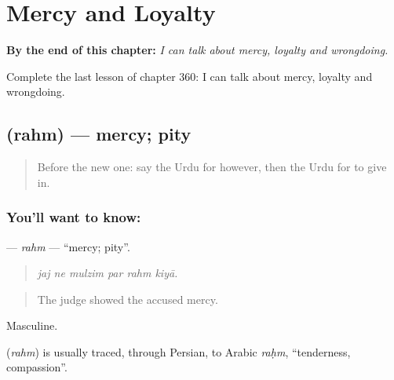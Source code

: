 
\chapter{Mercy and Loyalty}
\label{ch:ur-mercy-and-loyalty}

\begin{chapteropening}
\textbf{By the end of this chapter:} \emph{I can talk about mercy, loyalty and wrongdoing.}

Complete the last lesson of chapter 360: I can talk about mercy, loyalty and wrongdoing.
\end{chapteropening}

\section[\texorpdfstring{\ur{رحم} (rahm)}{رحم (rahm)}]{ (rahm) — mercy; pity}

\label{lesson:UR-C360-rahm}



\begin{quote}
Before the new one: say the Urdu for however, then the Urdu for to give in.
\end{quote}

\subsection*{You'll want to know: }
\textbf{} — \emph{rahm} — \textquotedblleft{}mercy; pity\textquotedblright{}.

\begin{quote}
     
\end{quote}

\begin{quote}
\emph{jaj ne mulzim par rahm kiyā.}
\end{quote}

\begin{quote}
The judge showed the accused mercy.
\end{quote}

Masculine.

\begin{cousinweb}
\textbf{} (\emph{rahm}) is usually traced, through Persian, to Arabic \emph{raḥm}, \textquotedblleft{}tenderness, compassion\textquotedblright{}.
\end{cousinweb}


